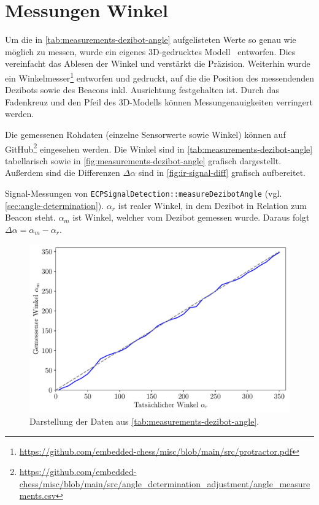 
\section{Messungen Winkel}
\label{sec:measurements-dezibot-angle}

Um die in \autoref{tab:measurements-dezibot-angle} aufgelisteten Werte so genau wie möglich zu messen, wurde ein eigenes 3D\hyphen gedrucktes Modell~\cite{felttipDezibotAlignmentPointer2025} entworfen. Dies vereinfacht das Ablesen der Winkel und verstärkt die Präzision. Weiterhin wurde ein Winkelmesser\footnote{\url{https://github.com/embedded-chess/misc/blob/main/src/protractor.pdf}} entworfen und gedruckt, auf die die Position des messendenden Dezibots sowie des Beacons inkl. Ausrichtung festgehalten ist. Durch das Fadenkreuz und den Pfeil des 3D-Modells können Messungenauigkeiten verringert werden.

Die gemessenen Rohdaten (einzelne Sensorwerte sowie Winkel) können auf GitHub\footnote{\url{https://github.com/embedded-chess/misc/blob/main/src/angle_determination_adjustment/angle_measurements.csv}} eingesehen werden. Die Winkel sind in \autoref{tab:measurements-dezibot-angle} tabellarisch sowie in \autoref{fig:measurements-dezibot-angle} grafisch dargestellt. Außerdem sind die Differenzen $\Delta\alpha$ sind in \autoref{fig:ir-signal-diff} grafisch aufbereitet.

\begin{table}[h!]
    \centering
    
    \caption{Signal-Messungen von \texttt{ECP\-Signal\-Detection::measure\-Dezibot\-Angle} (vgl. \autoref{sec:angle-determination}). $\alpha_r$ ist realer Winkel, in dem Dezibot in Relation zum Beacon steht. $\alpha_m$ ist Winkel, welcher vom Dezibot gemessen wurde. Daraus folgt $\Delta\alpha=\alpha_m - \alpha_r$.}
    \label{tab:measurements-dezibot-angle}
\end{table}

\begin{figure}[h]
    \centering
    \includegraphics[width=\textwidth]{../plot/ir_signal_comparison.pdf}
    \caption{Darstellung der Daten aus \autoref{tab:measurements-dezibot-angle}.}
    \label{fig:measurements-dezibot-angle}
\end{figure}


